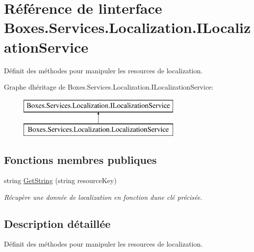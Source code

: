 \hypertarget{interface_boxes_1_1_services_1_1_localization_1_1_i_localization_service}{}\section{Référence de l\textquotesingle{}interface Boxes.\+Services.\+Localization.\+I\+Localization\+Service}
\label{interface_boxes_1_1_services_1_1_localization_1_1_i_localization_service}


Définit des méthodes pour manipuler les resources de localization.  


Graphe d\textquotesingle{}héritage de Boxes.\+Services.\+Localization.\+I\+Localization\+Service\+:\begin{figure}[H]
\begin{center}
\leavevmode
\includegraphics[height=2.000000cm]{interface_boxes_1_1_services_1_1_localization_1_1_i_localization_service}
\end{center}
\end{figure}
\subsection*{Fonctions membres publiques}
\begin{DoxyCompactItemize}
\item 
string \hyperlink{interface_boxes_1_1_services_1_1_localization_1_1_i_localization_service_ab614aa275c6964f694cb2e2c55fa601a}{Get\+String} (string resource\+Key)
\begin{DoxyCompactList}\small\item\em Récupère une donnée de localization en fonction d\textquotesingle{}une clé précisée. \end{DoxyCompactList}\end{DoxyCompactItemize}


\subsection{Description détaillée}
Définit des méthodes pour manipuler les resources de localization. 



